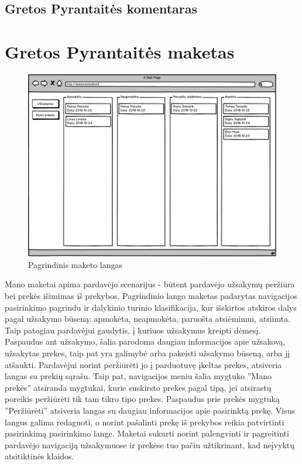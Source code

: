 \documentclass[oneside]{VUMIFPSkursinis}
\begin{document}
	\subsection{Gretos Pyrantaitės komentaras}

\section{Gretos Pyrantaitės maketas}
\begin{figure}
  		\includegraphics[width=\linewidth]{Mano_uzsakymai.png}
  		\caption{Pagrindinis maketo langas}
 		 \label{fig:mak2}
	\end{figure}
Mano maketai apima pardavėjo scenarijus -  būtent pardavėjo užsakymų peržiūra bei prekės išimimas iš prekybos.
Pagrindinio lango maketas padarytas navigacijos pasirinkimo pagrindu ir dalykinio turinio klasifikacija, kur išskirtos atskiros dalys pagal užsakymo būseną: apmokėta, neapmokėta, paruošta atsiėmimui, atsiimta. 
Taip patogiau pardavėjui gaudytis, į kuriuos užsakymus kreipti dėmesį.
Paspaudus ant užsakymo, šalia parodoma daugiau informacijos apie užsakovą, užsakytas prekes, taip pat yra galimybė arba pakeisti užsakymo būseną, arba jį atšaukti.
Pardavėjui norint peržiūrėti jo į parduotuvę įkeltas prekes, atsiveria langas su prekių sąrašu.
Taip pat, navigacijos meniu šalia mygtuko ''Mano prekės'' atsiranda mygtukai, kurie suskirsto prekes pagal tipą, jei atsirastų poreikis peržiūrėti tik tam tikro tipo prekes.
Paspaudus prie prekės mygtuką ''Peržiūrėti'' atsiveria langas su daugiau informacijos apie pasirinktą prekę.
Visus langus galima redaguoti, o norint pašalinti prekę iš prekybos reikia patvirtinti pasirinkimą pasirinkimo lange.
Maketai sukurti norint palengvinti ir pagreitinti pardavėjo navigaciją užsakymuose ir prekėse tuo pačiu užtikrinant, kad neįvyktų atsitiktinės klaidos.
\end{document}
